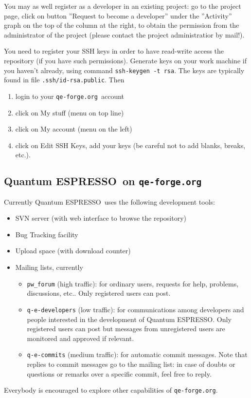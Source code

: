 \documentclass[12pt,a4paper]{article}
\def\qe{{\sc Quantum ESPRESSO}}
\def\qeforge{\texttt{qe-forge.org}}
\begin{document}
You may as well register as a developer
in an existing project: go to the project page, click on
button ''Request to become a developer'' under the ''Activity''
graph on the top of the column at the right, to obtain the permission
from the administrator of the project (please contact the
project administratior by mail!).

You need to register your SSH keys in order to have read-write
access the repository (if you have such permissions). Generate
keys on your work machine if you haven't already, using command
\texttt{ssh-keygen -t rsa}. The keys are typically found
 in file \texttt{.ssh/id-rsa.public}. Then
\begin{enumerate}
\item login to your \qeforge\ account
\item click on My stuff (menu on top line)
\item click on My account (menu on the left)
\item click on Edit SSH Keys, add your keys (be careful not to add blanks,
breaks, etc.).
\end{enumerate}

\subsection{\qe\ on \qeforge}

Currently \qe\ uses the following development tools:
\begin{itemize}
\item SVN server (with web interface to browse the repository)
\item Bug Tracking facility
\item Upload space (with download counter)
\item Mailing lists, currently
\begin{itemize}
\item \texttt{pw\_forum} (high traffic): for ordinary users,
requests for help, problems, discussions, etc.. Only
registered users can post.
\item \texttt{q-e-developers} (low traffic):
for communications among developers and people interested
in the development of \qe. Only registered users can post
but messages from unregistered users are monitored and
approved if relevant.
\item \texttt{q-e-commits} (medium traffic): for automatic
commit messages. Note that replies to commit messages go
to the mailing list: in case of doubts or questions or
remarks over a specific commit, feel free to reply.
\end{itemize}
\end{itemize}
Everybody is encouraged to explore other capabilities of \qeforge.
\end{document}
